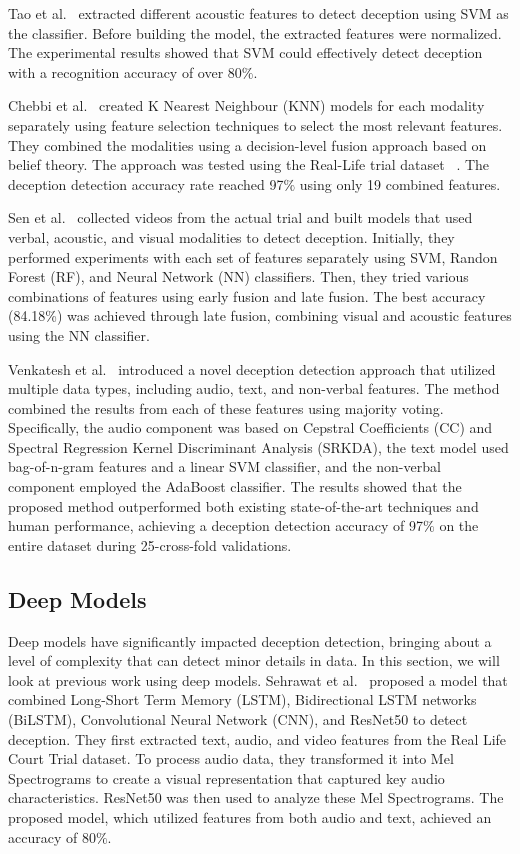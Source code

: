 \documentclass[12pt]{article}
\begin{document}
Tao et al.~\cite{tao2019speech} extracted different acoustic features to detect deception using SVM as the classifier. Before building the model, the extracted features were normalized. The experimental results showed that SVM could effectively detect deception with a recognition accuracy of over 80$\%$.
  
Chebbi et al.~\cite{chebbi2021deception} created K Nearest Neighbour (KNN) models for each modality separately using feature selection techniques to select the most relevant features. They combined the modalities using a decision-level fusion approach based on belief theory. The approach was tested using the Real-Life trial dataset ~\cite{csen2020multimodal}. The deception detection accuracy rate reached 97$\%$ using only 19 combined features.
  
Sen et al.~\cite{csen2020multimodal} collected videos from the actual trial and built models that used verbal, acoustic, and visual modalities to detect deception. Initially, they performed experiments with each set of features separately using SVM, Randon Forest (RF), and Neural Network (NN) classifiers. Then, they tried various combinations of features using early fusion and late fusion. The best accuracy (84.18\%) was achieved through late fusion, combining visual and acoustic features using the NN classifier. 
  
Venkatesh et al.~\cite{venkatesh2019robust} introduced a novel deception detection approach that utilized multiple data types, including audio, text, and non-verbal features. The method combined the results from each of these features using majority voting. Specifically, the audio component was based on Cepstral Coefficients (CC) and Spectral Regression Kernel Discriminant Analysis (SRKDA), the text model used bag-of-n-gram features and a linear SVM classifier, and the non-verbal component employed the AdaBoost classifier. The results showed that the proposed method outperformed both existing state-of-the-art techniques and human performance, achieving a deception detection accuracy of 97$\%$ on the entire dataset during 25-cross-fold validations.

\subsection{Deep Models}
Deep models have significantly impacted deception detection, bringing about a level of complexity that can detect minor details in data. In this section, we will look at previous work using deep models. Sehrawat et al.~\cite{sehrawat2023deception} proposed a model that combined Long-Short Term Memory (LSTM), Bidirectional LSTM networks (BiLSTM), Convolutional Neural Network (CNN), and ResNet50 to detect deception. They first extracted text, audio, and video features from the Real Life Court Trial dataset. To process audio data, they transformed it into Mel Spectrograms to create a visual representation that captured key audio characteristics. ResNet50 was then used to analyze these Mel Spectrograms. The proposed model, which utilized features from both audio and text, achieved an accuracy of 80$\%$. 
  
\end{document}
